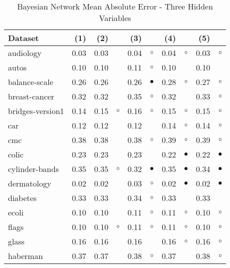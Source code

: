 \begin{table}[thb]
\caption{\label{bnmae3}Bayesian Network Mean Absolute Error - Three Hidden Variables}
\footnotesize
{\centering \begin{tabular}{lrr@{\hspace{0.1cm}}cr@{\hspace{0.1cm}}cr@{\hspace{0.1cm}}cr@{\hspace{0.1cm}}c}
\\
\hline
Dataset & (1)& (2) & & (3) & & (4) & & (5) & \\
\hline
audiology & 0.03 & 0.03 &           & 0.04 &   $\circ$ & 0.04 &   $\circ$ & 0.03 &    $\circ$\\
autos & 0.10 & 0.10 &           & 0.11 &   $\circ$ & 0.10 &           & 0.10 &           \\
balance-scale & 0.26 & 0.26 &           & 0.26 & $\bullet$ & 0.28 &   $\circ$ & 0.27 &    $\circ$\\
breast-cancer & 0.32 & 0.32 &           & 0.35 &   $\circ$ & 0.32 &           & 0.33 &    $\circ$\\
bridges-version1 & 0.14 & 0.15 &   $\circ$ & 0.16 &   $\circ$ & 0.15 &   $\circ$ & 0.15 &    $\circ$\\
car & 0.12 & 0.12 &           & 0.12 &           & 0.14 &   $\circ$ & 0.14 &    $\circ$\\
cmc & 0.38 & 0.38 &           & 0.38 &   $\circ$ & 0.39 &   $\circ$ & 0.39 &    $\circ$\\
colic & 0.23 & 0.23 &           & 0.23 &           & 0.22 & $\bullet$ & 0.22 &  $\bullet$\\
cylinder-bands & 0.35 & 0.35 &   $\circ$ & 0.32 & $\bullet$ & 0.35 & $\bullet$ & 0.34 &  $\bullet$\\
dermatology & 0.02 & 0.02 &           & 0.03 &   $\circ$ & 0.02 & $\bullet$ & 0.02 &  $\bullet$\\
diabetes & 0.33 & 0.33 &           & 0.34 &   $\circ$ & 0.33 &           & 0.33 &           \\
ecoli & 0.10 & 0.10 &           & 0.11 &   $\circ$ & 0.11 &   $\circ$ & 0.10 &    $\circ$\\
flags & 0.10 & 0.10 &   $\circ$ & 0.11 &   $\circ$ & 0.11 &   $\circ$ & 0.10 &    $\circ$\\
glass & 0.16 & 0.16 &           & 0.16 &           & 0.16 &   $\circ$ & 0.16 &    $\circ$\\
haberman & 0.37 & 0.37 &           & 0.38 &   $\circ$ & 0.37 &           & 0.38 &    $\circ$\\

\end{tabular}}
\end{table}
